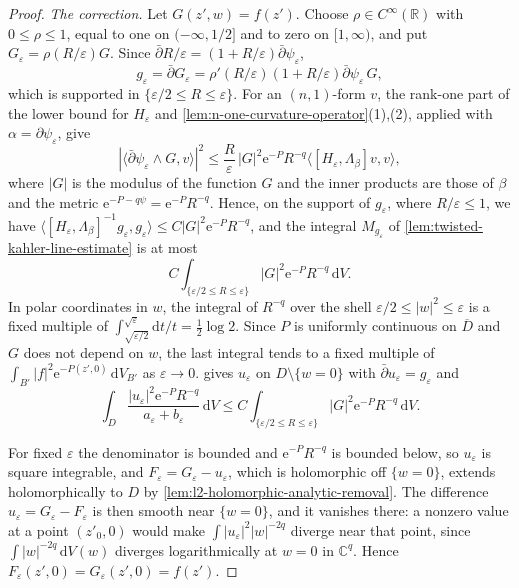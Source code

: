 \begin{proof}
\emph{The correction.} Let $G(z',w)=f(z')$. Choose $\rho\in C^\infty(\mathbb R)$ with $0\leq\rho\leq1$, equal to one on $(-\infty,1/2]$ and to zero on $[1,\infty)$, and put $G_\varepsilon=\rho(R/\varepsilon)G$. Since $\bar\partial R/\varepsilon=(1+R/\varepsilon)\bar\partial\psi_\varepsilon$,
\[
 g_\varepsilon=\bar\partial G_\varepsilon=\rho'(R/\varepsilon)(1+R/\varepsilon)
                         \bar\partial\psi_\varepsilon\,G,
\]
which is supported in $\{\varepsilon/2\leq R\leq\varepsilon\}$. For an $(n,1)$-form $v$, the rank-one part of the lower bound for $H_\varepsilon$ and \cref{lem:n-one-curvature-operator}(1),(2), applied with $\alpha=\partial\psi_\varepsilon$, give
\[
 |\langle\bar\partial\psi_\varepsilon\wedge G,v\rangle|^2
 \leq\frac R\varepsilon\,|G|^2\mathrm e^{-P}R^{-q}\langle[H_\varepsilon,\Lambda_\beta]v,v\rangle,
\]
where $|G|$ is the modulus of the function $G$ and the inner products are those of $\beta$ and the metric $\mathrm e^{-P-q\psi}=\mathrm e^{-P}R^{-q}$. Hence, on the support of $g_\varepsilon$, where $R/\varepsilon\leq1$, we have $\langle[H_\varepsilon,\Lambda_\beta]^{-1}g_\varepsilon,g_\varepsilon\rangle\leq C|G|^2\mathrm e^{-P}R^{-q}$, and the integral $M_{g_\varepsilon}$ of \cref{lem:twisted-kahler-line-estimate} is at most
\[
 C\int_{\{\varepsilon/2\leq R\leq\varepsilon\}}
                          |G|^2\mathrm e^{-P}R^{-q}\,\mathrm dV.
\]
In polar coordinates in $w$, the integral of $R^{-q}$ over the shell $\varepsilon/2\leq|w|^2\leq\varepsilon$ is a fixed multiple of $\int_{\sqrt{\varepsilon/2}}^{\sqrt\varepsilon}\mathrm dt/t=\frac12\log2$. Since $P$ is uniformly continuous on $\overline D$ and $G$ does not depend on $w$, the last integral tends to a fixed multiple of $\int_{B'}|f|^2\mathrm e^{-P(z',0)}\,\mathrm dV_{B'}$ as $\varepsilon\to0$.  gives $u_\varepsilon$ on $D\setminus\{w=0\}$ with $\bar\partial u_\varepsilon=g_\varepsilon$ and
\[
 \int_{D}\frac{|u_\varepsilon|^2\mathrm e^{-P}R^{-q}}{a_\varepsilon+b_\varepsilon}\,\mathrm dV\leq C\int_{\{\varepsilon/2\leq R\leq\varepsilon\}}
                          |G|^2\mathrm e^{-P}R^{-q}\,\mathrm dV.
\]

For fixed $\varepsilon$ the denominator is bounded and $\mathrm e^{-P}R^{-q}$ is bounded below, so $u_\varepsilon$ is square integrable, and $F_\varepsilon=G_\varepsilon-u_\varepsilon$, which is holomorphic off $\{w=0\}$, extends holomorphically to $D$ by \cref{lem:l2-holomorphic-analytic-removal}. The difference $u_\varepsilon=G_\varepsilon-F_\varepsilon$ is then smooth near $\{w=0\}$, and it vanishes there: a nonzero value at a point $(z'_0,0)$ would make $\int|u_\varepsilon|^2|w|^{-2q}$ diverge near that point, since $\int|w|^{-2q}\,\mathrm dV(w)$ diverges logarithmically at $w=0$ in $\mathbb C^q$. Hence $F_\varepsilon(z',0)=G_\varepsilon(z',0)=f(z')$.


\end{proof}
